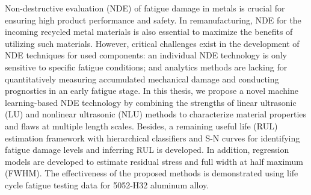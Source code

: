 Non-destructive evaluation (NDE) of fatigue damage in metals is crucial for ensuring high product performance and safety. In remanufacturing, NDE for the incoming recycled metal materials is also essential to maximize the benefits of utilizing such materials. However, critical challenges exist in the development of NDE techniques for used components: an individual NDE technology is only sensitive to specific fatigue conditions; and analytics methods are lacking for quantitatively measuring accumulated mechanical damage and conducting prognostics in an early fatigue stage. In this thesis, we propose a novel machine learning-based NDE technology by combining the strengths of linear ultrasonic (LU) and nonlinear ultrasonic (NLU) methods to characterize material properties and flaws at multiple length scales. Besides, a remaining useful life (RUL) estimation framework with hierarchical classifiers and S-N curves for identifying fatigue damage levels and inferring RUL is developed. In addition, regression models are developed to estimate residual stress and full width at half maximum (FWHM). The effectiveness of the proposed methods is demonstrated using life cycle fatigue testing data for 5052-H32 aluminum alloy.
